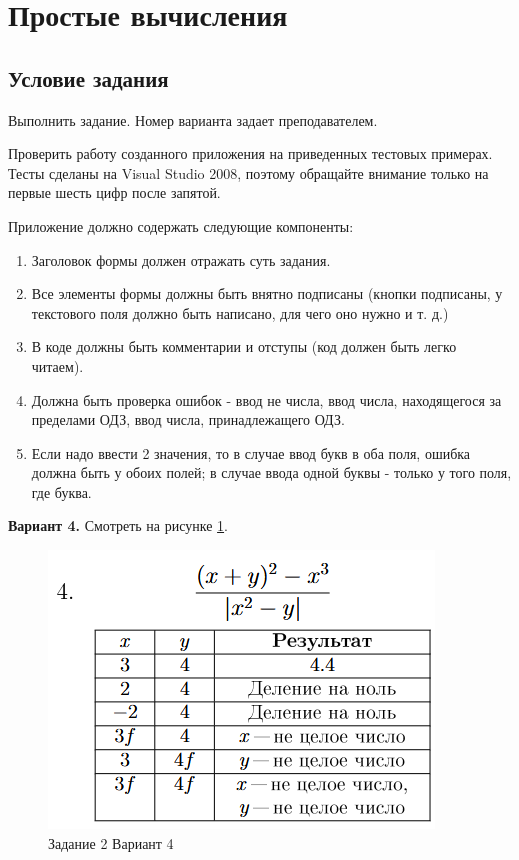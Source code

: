 \section{Простые вычисления}

\subsection{Условие задания}
Выполнить задание. Номер варианта задает преподавателем. 

Проверить работу созданного приложения на приведенных тестовых примерах. Тесты сделаны на Visual Studio 2008, поэтому обращайте внимание только на первые шесть цифр после запятой.

Приложение должно содержать следующие компоненты:
\begin{enumerate}
    \item Заголовок формы должен отражать суть задания.
    \item Все элементы формы должны быть внятно подписаны (кнопки подписаны, у текстового поля должно быть написано, для чего оно нужно и т. д.)
    \item В коде должны быть комментарии и отступы (код должен быть легко читаем).
    \item Должна быть проверка ошибок - ввод не числа, ввод числа, находящегося за пределами ОДЗ, ввод числа, принадлежащего ОДЗ.
    \item Если надо ввести 2 значения, то в случае ввод букв в оба поля, ошибка должна быть у обоих полей; в случае ввода одной буквы - только у того поля, где буква.
\end{enumerate}

\textbf{Вариант 4.} Смотреть на рисунке \ref{task2_var4}.
\begin{figure}[H]
    \centering
    \includegraphics[width=0.5\linewidth]{lections/img/task2_var4.png}
    \caption{Задание 2 Вариант 4}
    \label{task2_var4}
\end{figure}

